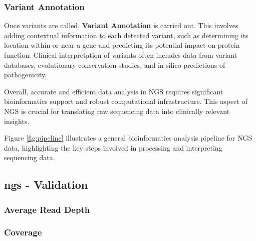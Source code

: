 \subsubsection{\textbf{Variant Annotation}} \label{subsubsec:ngs_annotation}
Once variants are called, \textbf{Variant Annotation} is carried out. This involves adding contextual information to each detected variant, such as determining its location within or near a gene and predicting its potential impact on protein function. Clinical interpretation of variants often includes data from variant databases, evolutionary conservation studies, and in silico predictions of pathogenicity. \cite{Rehm2013} 

Overall, accurate and efficient data analysis in NGS requires significant bioinformatics support and robust computational infrastructure. This aspect of NGS is crucial for translating raw sequencing data into clinically relevant insights.

Figure \ref{fig:pipeline} illustrates a general bioinformatics analysis pipeline for NGS data, highlighting the key steps involved in processing and interpreting sequencing data.

\subsection{\acl{ngs} - Validation} \label{subsec:ngs_bioinformatics}

\subsubsection{\textbf{Average Read Depth}} \label{subsubsec:ngs_ard}


\subsubsection{\textbf{Coverage}} \label{subsubsec:ngs_coverage}




